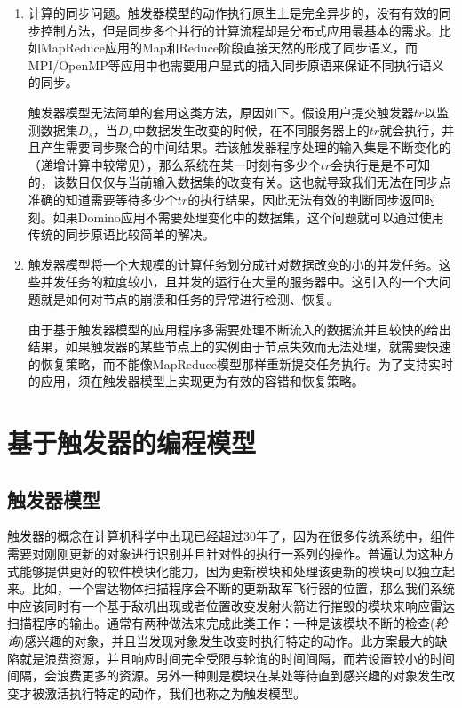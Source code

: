 \begin{enumerate}
\item 计算的同步问题。触发器模型的动作执行原生上是完全异步的，没有有效的同步控制方法，但是同步多个并行的计算流程却是分布式应用最基本的需求。比如MapReduce应用的Map和Reduce阶段直接天然的形成了同步语义，而MPI/OpenMP等应用中也需要用户显式的插入同步原语来保证不同执行语义的同步。

触发器模型无法简单的套用这类方法，原因如下。假设用户提交触发器$tr$以监测数据集$D_s$，当$D_s$中数据发生改变的时候，在不同服务器上的$tr$就会执行，并且产生需要同步聚合的中间结果。若该触发器程序处理的输入集是不断变化的（递增计算中较常见），那么系统在某一时刻有多少个$tr$会执行是是不可知的，该数目仅仅与当前输入数据集的改变有关。这也就导致我们无法在同步点准确的知道需要等待多少个$tr$的执行结果，因此无法有效的判断同步返回时刻。如果Domino应用不需要处理变化中的数据集，这个问题就可以通过使用传统的同步原语比较简单的解决。

\item 触发器模型将一个大规模的计算任务划分成针对数据改变的小的并发任务。这些并发任务的粒度较小，且并发的运行在大量的服务器中。这引入的一个大问题就是如何对节点的崩溃和任务的异常进行检测、恢复。

由于基于触发器模型的应用程序多需要处理不断流入的数据流并且较快的给出结果，如果触发器的某些节点上的实例由于节点失效而无法处理，就需要快速的恢复策略，而不能像MapReduce模型那样重新提交任务执行。为了支持实时的应用，须在触发器模型上实现更为有效的容错和恢复策略。

\end{enumerate}

\section{基于触发器的编程模型}
\label{section:intro}
\subsection{触发器模型}
触发器的概念在计算机科学中出现已经超过30年了，因为在很多传统系统中，组件需要对刚刚更新的对象进行识别并且针对性的执行一系列的操作。普遍认为这种方式能够提供更好的软件模块化能力，因为更新模块和处理该更新的模块可以独立起来。比如，一个雷达物体扫描程序会不断的更新敌军飞行器的位置，那么我们系统中应该同时有一个基于敌机出现或者位置改变发射火箭进行摧毁的模块来响应雷达扫描程序的输出。通常有两种做法来完成此类工作：一种是该模块不断的检查(\textit{轮询})感兴趣的对象，并且当发现对象发生改变时执行特定的动作。此方案最大的缺陷就是浪费资源，并且响应时间完全受限与轮询的时间间隔，而若设置较小的时间间隔，会浪费更多的资源。另外一种则是模块在某处等待直到感兴趣的对象发生改变才被激活执行特定的动作，我们也称之为触发模型。

